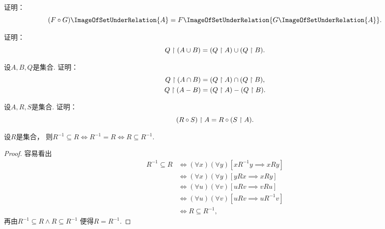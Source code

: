 \begin{example}
证明：\begin{equation}
	(F \circ G)\ImageOfSetUnderRelation{A}
	= F\ImageOfSetUnderRelation{G\ImageOfSetUnderRelation{A}}.
\end{equation}
\end{example}

\begin{example}
证明：\begin{equation}
	Q \upharpoonright (A \cup B)
	= (Q \upharpoonright A)\cup(Q \upharpoonright B).
\end{equation}
\end{example}

\begin{example}
设\(A,B,Q\)是集合.
证明：\begin{gather}
	Q \upharpoonright (A \cap B)
	= (Q \upharpoonright A) \cap (Q \upharpoonright B), \\
	Q \upharpoonright (A - B)
	= (Q \upharpoonright A)
	- (Q \upharpoonright B).
\end{gather}
\end{example}

\begin{example}
设\(A,R,S\)是集合.
证明：\begin{equation}
	(R \circ S) \upharpoonright A = R \circ (S \upharpoonright A).
\end{equation}
\end{example}

\begin{proposition}\label{theorem:集合论.与逆相等的充分必要条件}
设\(R\)是集合，
则\(R^{-1} \subseteq R
\iff R^{-1} = R
\iff R \subseteq R^{-1}\).
\begin{proof}
容易看出\begin{align*}
	R^{-1} \subseteq R
	&\iff
	(\forall x)(\forall y)[xR^{-1}y \implies xRy] \\
	&\iff
	(\forall x)(\forall y)[yRx \implies xRy] \\
	&\iff
	(\forall u)(\forall v)[uRv \implies vRu] \\
	&\iff
	(\forall u)(\forall v)[uRv \implies uR^{-1}v] \\
	&\iff
	R \subseteq R^{-1},
\end{align*}
再由\(R^{-1} \subseteq R \land R \subseteq R^{-1}\)
便得\(R = R^{-1}\).
\end{proof}
\end{proposition}

